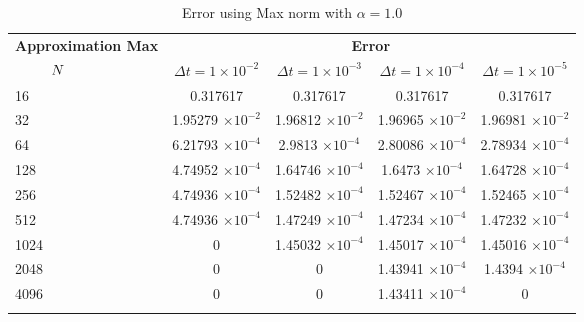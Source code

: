 \begin{table}[H]
		\begin{tabular}{lcccc}
			\toprule
			\multicolumn{1}{c}{\textbf{Approximation Max}} & \multicolumn{4}{c}{\textbf{Error}} \\
			$\hspace{9mm}N$ & $\Delta t=1\times 10^{-2}$ & $\Delta t=1\times 10^{-3}$ & $\Delta t=1\times 10^{-4}$ & $\Delta t=1\times 10^{-5}$ \\
			\midrule
			\hspace{7mm} 16 & 0.317617    & 0.317617    & 0.317617    & 0.317617    \\
			\midrule
			\hspace{7mm} 32 & 1.95279 $\times 10 ^{-2}$  & 1.96812 $\times 10 ^{-2}$   & 1.96965 $\times 10 ^{-2}$   & 1.96981 $\times 10 ^{-2}$   \\
			\midrule
			\hspace{7mm} 64 & 6.21793 $\times 10 ^{-4}$ & 2.9813 $\times 10 ^{-4}$  & 2.80086 $\times 10 ^{-4}$ & 2.78934 $\times 10 ^{-4}$ \\
			\midrule
			\hspace{7mm} 128 & 4.74952 $\times 10 ^{-4}$ & 1.64746 $\times 10 ^{-4}$ & 1.6473 $\times 10 ^{-4}$  & 1.64728 $\times 10 ^{-4}$ \\
			\midrule
			\hspace{7mm} 256 & 4.74936 $\times 10 ^{-4}$ & 1.52482 $\times 10 ^{-4}$ & 1.52467 $\times 10 ^{-4}$ & 1.52465 $\times 10 ^{-4}$ \\
			\midrule
			\hspace{7mm} 512 & 4.74936 $\times 10 ^{-4}$ & 1.47249 $\times 10 ^{-4}$ & 1.47234 $\times 10 ^{-4}$ & 1.47232 $\times 10 ^{-4}$ \\
			\midrule
			\hspace{7mm} 1024 & 0           & 1.45032 $\times 10 ^{-4}$ & 1.45017 $\times 10 ^{-4}$ & 1.45016 $\times 10 ^{-4}$ \\
			\midrule
			\hspace{7mm} 2048 & 0           & 0           & 1.43941 $\times 10 ^{-4}$ & 1.4394 $\times 10 ^{-4}$ \\
			\midrule
			\hspace{7mm} 4096 & 0           & 0           & 1.43411 $\times 10 ^{-4}$ & 0           \\
			\\
			\bottomrule
		\end{tabular}
		\caption{Error using Max norm with $\alpha=1.0$}
		\label{Collocation_tabla_max_alpha=1}
	\end{table}
	
